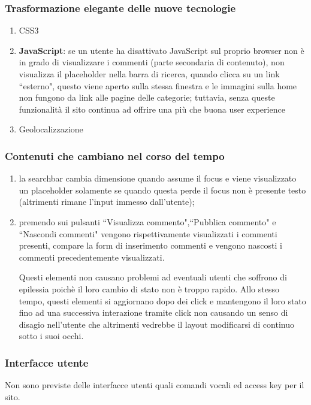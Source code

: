 \subsubsection{Trasformazione elegante delle nuove tecnologie}
\begin{enumerate}
\item CSS3%
\item \textbf{JavaScript}: se un utente ha disattivato JavaScript sul proprio
browser non è in grado di visualizzare i commenti (parte secondaria di contenuto), non visualizza il placeholder nella barra di ricerca, quando clicca su un link ``esterno", questo viene aperto sulla stessa finestra e le immagini sulla home non fungono da link alle pagine delle categorie; tuttavia, senza queste funzionalità il sito continua ad offrire una più che buona user experience
\item Geolocalizzazione %
\end{enumerate}

\subsubsection{Contenuti che cambiano nel corso del tempo}
\begin{enumerate}
\item la searchbar cambia dimensione quando assume il focus e viene
visualizzato un placeholder solamente se quando questa perde il focus non è
presente testo (altrimenti rimane l'input immesso dall'utente);
\item premendo sui pulsanti ``Visualizza commento",``Pubblica commento" e
``Nascondi commenti" vengono rispettivamente visualizzati i commenti presenti,
compare la form di inserimento commenti e vengono nascosti i commenti
precedentemente visualizzati.

Questi elementi non causano problemi ad eventuali utenti che soffrono di
epilessia poichè il loro cambio di stato non è troppo rapido. Allo stesso
tempo, questi elementi si aggiornano dopo dei click e mantengono il loro stato
fino ad una successiva interazione tramite click non causando un senso di
disagio nell'utente che altrimenti vedrebbe il layout modificarsi di continuo
sotto i suoi occhi.
\end{enumerate}

\subsubsection{Interfacce utente}
Non sono previste delle interfacce utenti quali comandi vocali ed access key
per il sito.

